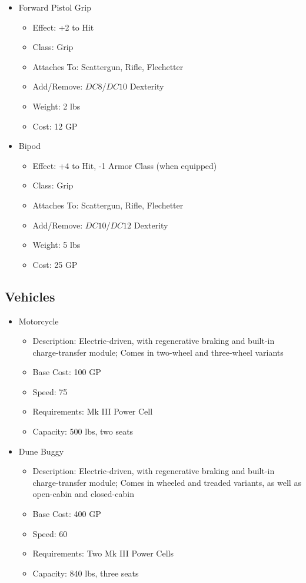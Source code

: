 \documentclass[12pt, twoside]{article}
\begin{document}
\begin{FlushLeft}
\begin{multicols}{2}
			\begin{itemize}[wide]
				\item Forward Pistol Grip
				\begin{itemize}
					\item Effect: +2 to Hit
					\item Class: Grip
					\item Attaches To: Scattergun, Rifle, Flechetter 
					\item Add/Remove: $DC8$/$DC10$ Dexterity
					\item Weight: 2 lbs
					\item Cost: 12 GP
				\end{itemize}
				\item Bipod
				\begin{itemize}
					\item Effect: +4 to Hit, -1 Armor Class (when equipped)
					\item Class: Grip
					\item Attaches To: Scattergun, Rifle, Flechetter 
					\item Add/Remove: $DC10$/$DC12$ Dexterity
					\item Weight: 5 lbs
					\item Cost: 25 GP
				\end{itemize}
			\end{itemize}

			\subsection{Vehicles}
			\begin{itemize}[wide]
				\item Motorcycle
				\begin{itemize}
					\item Description: Electric-driven, with regenerative braking and built-in charge-transfer module; Comes in two-wheel and three-wheel variants
					\item Base Cost: 100 GP
					\item Speed: 75
					\item Requirements: Mk III Power Cell
					\item Capacity: 500 lbs, two seats
				\end{itemize}
				\item Dune Buggy
				\begin{itemize}
					\item Description: Electric-driven, with regenerative braking and built-in charge-transfer module; Comes in wheeled and treaded variants, as well as open-cabin and closed-cabin
					\item Base Cost: 400 GP
					\item Speed: 60
					\item Requirements: Two Mk III Power Cells
					\item Capacity: 840 lbs, three seats
				\end{itemize}
			\end{itemize}
			\vfill \null \columnbreak


\end{multicols}
\end{FlushLeft}
\end{document}
